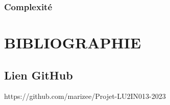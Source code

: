 \documentclass[a4paper]{article}
\begin{document}
\subsubsection*{Complexité}

\newpage
\section{BIBLIOGRAPHIE}

\nocite{*}




\subsection*{Lien GitHub} 
https://github.com/marizee/Projet-LU2IN013-2023
\end{document}
